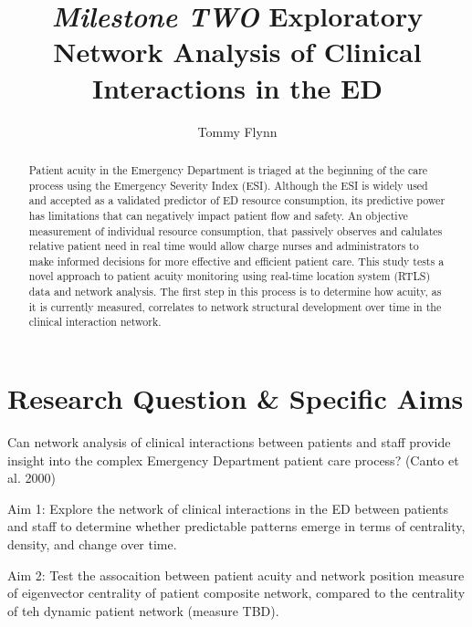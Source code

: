 \documentclass[]{elsarticle} %
\begin{document}
\begin{frontmatter}

  \title{\emph{Milestone TWO} Exploratory Network Analysis of Clinical
Interactions in the ED}
    \author[Emory University]{Tommy Flynn}
      \address[Emory University]{GitHub repository
\url{https://github.com/tommyflynn/Flynn_N741_Project/tree/master/Flynn_Project}}
  
  \begin{abstract}
  Patient acuity in the Emergency Department is triaged at the beginning
  of the care process using the Emergency Severity Index (ESI). Although
  the ESI is widely used and accepted as a validated predictor of ED
  resource consumption, its predictive power has limitations that can
  negatively impact patient flow and safety. An objective measurement of
  individual resource consumption, that passively observes and calulates
  relative patient need in real time would allow charge nurses and
  administrators to make informed decisions for more effective and
  efficient patient care. This study tests a novel approach to patient
  acuity monitoring using real-time location system (RTLS) data and
  network analysis. The first step in this process is to determine how
  acuity, as it is currently measured, correlates to network structural
  development over time in the clinical interaction network.
  \end{abstract}
  
 \end{frontmatter}

\section{Research Question \& Specific
Aims}\label{research-question-specific-aims}

Can network analysis of clinical interactions between patients and staff
provide insight into the complex Emergency Department patient care
process? (Canto et al. 2000)

Aim 1: Explore the network of clinical interactions in the ED between
patients and staff to determine whether predictable patterns emerge in
terms of centrality, density, and change over time.

Aim 2: Test the assocaition between patient acuity and network position
measure of eigenvector centrality of patient composite network, compared
to the centrality of teh dynamic patient network (measure TBD).
\end{document}

